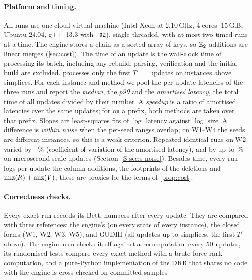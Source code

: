 \paragraph{Platform and timing.}\label{sec:exp-platform}\label{sec:exp-timing}
All runs use one cloud virtual machine (Intel Xeon at 2.10\,GHz, 4 cores,
15\,GiB, Ubuntu 24.04, g++~13.3 with \texttt{-O2}), single-threaded, with at most
two timed runs at a time. The engine stores a chain as a sorted array of keys,
so $\mathbb{Z}_2$ additions are linear merges (\cref{sec:cost}). The time of an update is
the wall-clock time of processing its batch, including any rebuild; parsing,
verification and the initial build are excluded.  processes only
the first $T'={}$\NumPrefix{} updates on instances above \NumGudhiFullLimit{}
simplices. For each instance and method we pool the per-update latencies of the
three runs and report the \emph{median}, the \emph{p99} and the \emph{amortised
latency}, the total time of all updates divided by their number. A
\emph{speedup} is a ratio of amortised latencies over the same updates; for
 on a prefix, both methods are taken over that prefix. Slopes are
least-squares fits of $\log$ latency against $\log$ size. A difference is
\emph{within noise} when the per-seed ranges overlap; on W1--W4 the seeds are
different instances, so this is a weak criterion. Repeated identical runs on W2
varied by \NumNoiseCVFullIdAmort--\NumNoiseCVMmhmAmort\,\% (coefficient of
variation of the amortised latency), and by up to \NumNoiseCVAmortMax\,\% on
microsecond-scale updates (Section~\ref{S-sec:s-noise}). Besides time, every run logs
per update the column additions, the footprints of the deletions and
$\operatorname{nnz}(R)+\operatorname{nnz}(V)$; these are proxies for the terms of \cref{prop:cost}.

\paragraph{Correctness checks.}\label{sec:exp-correctness}
Every exact run records its Betti numbers after every update. They are compared
with three references: the engine's  (on every state of every
instance), the closed forms (W1, W2, W3, W5), and GUDHI (all updates up to
\NumGudhiFullLimit{} simplices, the first $T'$ above). The engine also checks
itself against a recomputation every 50 updates, its randomised tests compare
every exact method with a brute-force rank computation, and a pure-Python
implementation of the DRB that shares no code with the engine is cross-checked
on \NumReferenceSamples{} committed samples.

